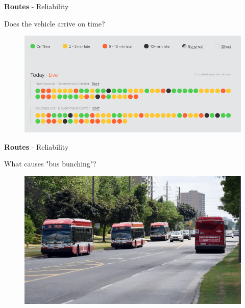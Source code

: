 \documentclass[aspectratio=169]{beamer}
\begin{document}
\begin{frame}
	
	\textbf{Routes} - Reliability
	
	\vspace{2mm}
	
	Does the vehicle arrive on time?
	
	\vspace{2mm}
	

		\begin{figure}
			\centering
			\includegraphics[width=1\linewidth]{images/transit-miami-screenshot.png}
		\end{figure}

	
\end{frame}



\begin{frame}
	
	\textbf{Routes} - Reliability
	
	\vspace{2mm}
	
	What causes "bus bunching"?
	
	\begin{figure}
		\centering
		\includegraphics[width=0.8\linewidth]{images/finch39.jpg}
	\end{figure}
	
	
\end{frame}
\end{document}
